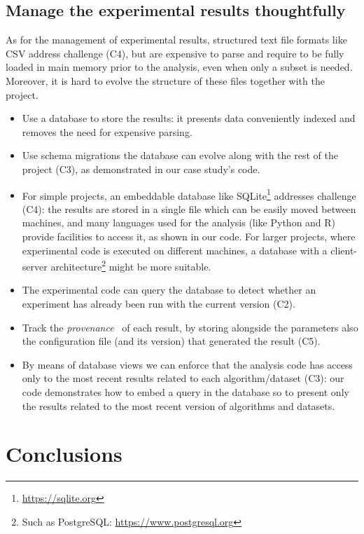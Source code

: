 \documentclass{llncs}
\begin{document}
\subsection{Manage the experimental results thoughtfully}
\label{sec:manage-experiments}

As for the management of experimental results, structured text file formats like CSV address challenge (C4), but are expensive to parse and require to be fully loaded in main memory prior to the analysis, even when only a subset is needed.
Moreover, it is hard to evolve the structure of these files together with 
the project.

\begin{itemize}
\item Use a database to store the results: it presents data 
conveniently indexed and removes the need for expensive parsing. 
\item Use schema migrations the database can evolve along with
the rest of the project (C3), as demonstrated in our case study's code.
\item For simple projects, an embeddable database like SQLite\footnote{\url{https://sqlite.org}}
addresses challenge (C4): the results are stored in a single file which can be easily moved
between machines, and many languages used for the analysis (like Python and R) provide
facilities to access it, as shown in our code. 
For larger projects, where experimental code is executed on different machines, a database with
a client-server architecture\footnote{Such as PostgreSQL: \url{https://www.postgresql.org}} 
might be more suitable.
\item The experimental code can query the database to detect whether an experiment has already been run with the current version (C2).
\item Track the \emph{provenance}~\cite{BunemanKW01} of each result, by storing alongside the parameters also the configuration file (and its version) that generated the result (C5).
\item
By means of database views we can enforce that the analysis code
has access only to the most recent results related to each algorithm/dataset (C3): our code
demonstrates how to embed a query in the database so to present only the results related to 
the most recent version of algorithms and datasets.
\end{itemize}

\section{Conclusions}
\end{document}

